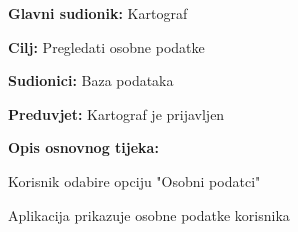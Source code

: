 \begin{packed_item}
\begin{packed_item}
					\end{packed_item}
					\end{packed_item}
				
					\noindent {}
					\begin{packed_item}
						
						\item \textbf{Glavni sudionik: }Kartograf
						\item  \textbf{Cilj:} Pregledati osobne podatke
						\item  \textbf{Sudionici:} Baza podataka
						\item  \textbf{Preduvjet:} Kartograf je prijavljen
						\item  \textbf{Opis osnovnog tijeka:}
						
						\item[] \begin{packed_enum}
							
							\item Korisnik odabire opciju "Osobni podatci"
							\item Aplikacija prikazuje osobne podatke korisnika
						\end{packed_enum}
					\end{packed_item}
					
